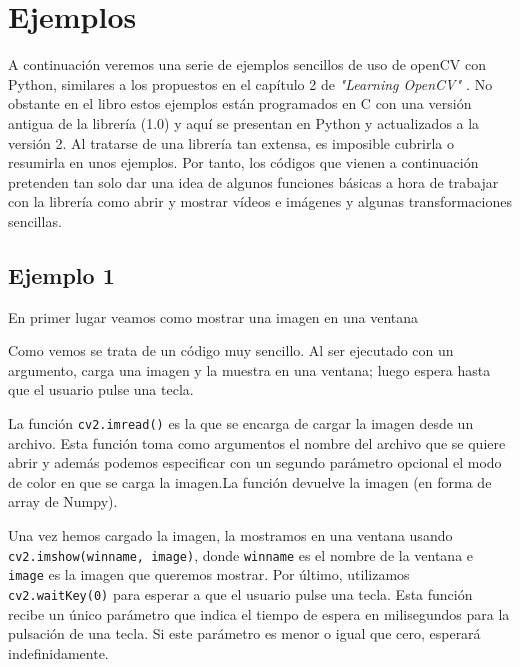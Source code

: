 \documentclass[a4paper,openright, 12pt]{book}
\begin{document}
\section{Ejemplos}
A continuación veremos una serie de ejemplos sencillos de uso de openCV con Python, similares a los propuestos en el capítulo 2 de \textit{"Learning OpenCV" \cite{oreilly}}. No obstante en el libro estos ejemplos están programados en C con una versión antigua de la librería (1.0) y aquí se presentan en Python y actualizados a la versión 2. Al tratarse de una librería tan extensa, es imposible cubrirla o resumirla en unos ejemplos. Por tanto, los códigos que vienen a continuación pretenden tan solo dar una idea de algunos funciones básicas a hora de trabajar con la librería como abrir y mostrar vídeos e imágenes y algunas transformaciones sencillas.
\subsection*{Ejemplo 1}
En primer lugar veamos como mostrar una imagen en una ventana

Como vemos se trata de un código muy sencillo. Al ser ejecutado con un argumento, carga una imagen y la muestra en una ventana; luego espera hasta que el usuario pulse una tecla.

La función \lstinline|cv2.imread()| es la que se encarga de cargar la imagen desde un archivo.  Esta función toma como argumentos el nombre del archivo que se quiere abrir y además podemos especificar con un segundo parámetro opcional el modo de color en que se carga la imagen.La función devuelve la imagen (en forma de array de Numpy).


Una vez hemos cargado la imagen, la mostramos en una ventana usando \lstinline|cv2.imshow(winname, image)|, donde \lstinline|winname| es el nombre de la ventana e \lstinline|image| es la imagen que queremos mostrar.
Por último, utilizamos \lstinline|cv2.waitKey(0)| para esperar a que el usuario pulse una tecla. Esta función recibe un único parámetro que indica el tiempo de espera en milisegundos para la pulsación de una tecla. Si este parámetro es menor o igual que cero, esperará indefinidamente.
\end{document}
